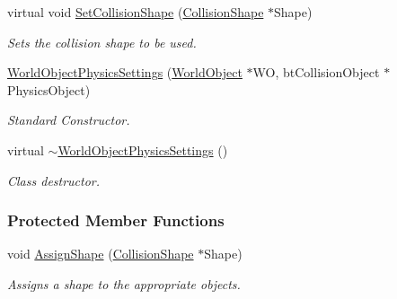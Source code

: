 \begin{DoxyCompactItemize}
virtual void \hyperlink{classMezzanine_1_1WorldObjectPhysicsSettings_ae8b786e26eed334b283156b442807039}{SetCollisionShape} (\hyperlink{classMezzanine_1_1CollisionShape}{CollisionShape} $\ast$Shape)
\begin{DoxyCompactList}\small\item\em Sets the collision shape to be used. \item\end{DoxyCompactList}\item 
\hyperlink{classMezzanine_1_1WorldObjectPhysicsSettings_affb46355a699ca229f906dda739bc5da}{WorldObjectPhysicsSettings} (\hyperlink{classMezzanine_1_1WorldObject}{WorldObject} $\ast$WO, btCollisionObject $\ast$PhysicsObject)
\begin{DoxyCompactList}\small\item\em Standard Constructor. \item\end{DoxyCompactList}\item 
\hypertarget{classMezzanine_1_1WorldObjectPhysicsSettings_a19b8556f7dedb40ac4b987fb5d0c02d8}{
virtual \hyperlink{classMezzanine_1_1WorldObjectPhysicsSettings_a19b8556f7dedb40ac4b987fb5d0c02d8}{$\sim$WorldObjectPhysicsSettings} ()}
\label{classMezzanine_1_1WorldObjectPhysicsSettings_a19b8556f7dedb40ac4b987fb5d0c02d8}

\begin{DoxyCompactList}\small\item\em Class destructor. \item\end{DoxyCompactList}\end{DoxyCompactItemize}
\subsubsection*{Protected Member Functions}
\begin{DoxyCompactItemize}
\item 
\hypertarget{classMezzanine_1_1WorldObjectPhysicsSettings_a9295552e05287fd3d292e19be5dfec4e}{
void \hyperlink{classMezzanine_1_1WorldObjectPhysicsSettings_a9295552e05287fd3d292e19be5dfec4e}{AssignShape} (\hyperlink{classMezzanine_1_1CollisionShape}{CollisionShape} $\ast$Shape)}
\label{classMezzanine_1_1WorldObjectPhysicsSettings_a9295552e05287fd3d292e19be5dfec4e}

\begin{DoxyCompactList}\small\item\em Assigns a shape to the appropriate objects. \item\end{DoxyCompactList}\end{DoxyCompactItemize}
